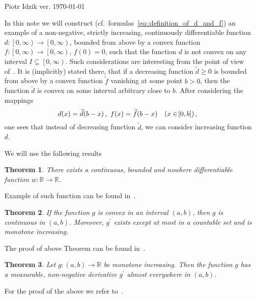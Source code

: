 \documentclass[12pt]{article}
\newcommand{\R}{\mathbb{R}}
\renewcommand{\geq}{\geqslant}
\newcommand{\paren}[1]{\! \left(#1 \right)}
\newcommand{\bracket}[1]{\! \left[#1 \right]}
\theoremstyle{plain}
\newtheorem{theorem}{Theorem}
\theoremstyle{definition}
\theoremstyle{remark}
\begin{document}
\noindent Piotr Idzik \hfill ver. \today\ \currenttime{}

\vspace*{1cm}
In this note we will construct (cf.\ formulas~\eqref{eq::definition_of_d_and_f}) an example of
a non-negative, strictly increasing, continuously differentiable function $d \colon \left[0, \infty \right) \to \left[0, \infty \right)$,
bounded from above by a convex function $f\colon\left[0, \infty \right) \to \left[0, \infty \right)$, $f\paren{0} = 0$,
such that the function $d$ is not convex on any interval $I \subseteq \left[0, \infty \right)$.
Such considerations are interesting from the point of view of~\cite[p. 167]{Levandosky1998}.
It is (implicitly) stated there, that if a decreasing function
$\widetilde{d} \geq 0$ is bounded from above by a convex function $\widetilde{f}$
vanishing at some point $b > 0$,
then the function $\widetilde{d}$ is convex on some interval arbitrary close to $b$.
After considering the mappings
\begin{equation*}
    d\paren{x} =  \widetilde{d}\paren{b-x}, \ f\paren{x} =  \widetilde{f}\paren{b-x} \quad \paren{x \in \bracket{0, b}}, \\
\end{equation*}
one sees that instead of decreasing function $\widetilde{d}$, we can consider increasing function $d$. 

We will use the following results
\begin{theorem}
    There exists a continuous, bounded and nowhere differentiable function $w \colon \R \to \R$.
\end{theorem}
Example of such function can be found in~\cite[Example 8, p. 38]{gelbaum1964counterexamples}.
 
\begin{theorem} \label{thm::convex_monotone_der}
    If the function $g$ is convex in an interval $\paren{a, b}$, then $g$ is continuous in $\paren{a, b}$.
    Moreover, $g^\prime$ exists except at most in a countable set and is monotone increasing.
\end{theorem}
The proof of above Theorem can be found in~\cite[Theorem 7.40, p. 120]{wheeden1977measure}.

\begin{theorem} \label{thm::monotone_diff_ae}
    Let $g \colon \paren{a, b} \to \R$ be monotone increasing.
    Then the function $g$ has a measurable, non-negative derivative $g^\prime$ almost everywhere in $\paren{a, b}$.
\end{theorem}
For the proof of the above we refer to~\cite[Theorem 7.21, page 111]{wheeden1977measure}.
\end{document}

